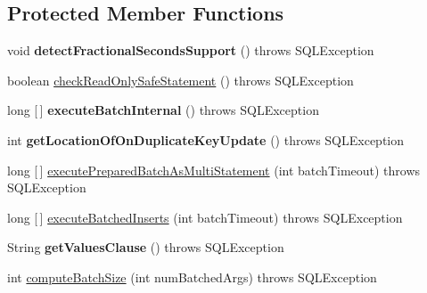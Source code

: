 \subsection*{Protected Member Functions}
\begin{DoxyCompactItemize}
\item 
\mbox{\label{classcom_1_1mysql_1_1jdbc_1_1_prepared_statement_ab69d1c322e914d0d4452ee635444219c}} 
void {\bfseries detect\+Fractional\+Seconds\+Support} ()  throws S\+Q\+L\+Exception 
\item 
boolean \mbox{\hyperlink{classcom_1_1mysql_1_1jdbc_1_1_prepared_statement_af96357c4ef89d1eae553d657f4989bcc}{check\+Read\+Only\+Safe\+Statement}} ()  throws S\+Q\+L\+Exception 
\item 
\mbox{\label{classcom_1_1mysql_1_1jdbc_1_1_prepared_statement_ac38752e04261745fc1bbff0533c6893f}} 
long \mbox{[}$\,$\mbox{]} {\bfseries execute\+Batch\+Internal} ()  throws S\+Q\+L\+Exception 
\item 
\mbox{\label{classcom_1_1mysql_1_1jdbc_1_1_prepared_statement_a9375859ff627133c5917da65bf03108d}} 
int {\bfseries get\+Location\+Of\+On\+Duplicate\+Key\+Update} ()  throws S\+Q\+L\+Exception 
\item 
long \mbox{[}$\,$\mbox{]} \mbox{\hyperlink{classcom_1_1mysql_1_1jdbc_1_1_prepared_statement_ad3cdc3e336070c453b5878ce9ba8a0cc}{execute\+Prepared\+Batch\+As\+Multi\+Statement}} (int batch\+Timeout)  throws S\+Q\+L\+Exception 
\item 
long \mbox{[}$\,$\mbox{]} \mbox{\hyperlink{classcom_1_1mysql_1_1jdbc_1_1_prepared_statement_a4b54450205db6b099922240e4f2e72a0}{execute\+Batched\+Inserts}} (int batch\+Timeout)  throws S\+Q\+L\+Exception 
\item 
\mbox{\label{classcom_1_1mysql_1_1jdbc_1_1_prepared_statement_a1f930baaa3569bf0a59983cd73e0cf3f}} 
String {\bfseries get\+Values\+Clause} ()  throws S\+Q\+L\+Exception 
\item 
int \mbox{\hyperlink{classcom_1_1mysql_1_1jdbc_1_1_prepared_statement_a2de0ab2631bf812f061ea336302f2b62}{compute\+Batch\+Size}} (int num\+Batched\+Args)  throws S\+Q\+L\+Exception 
\item 

\end{DoxyCompactItemize}
